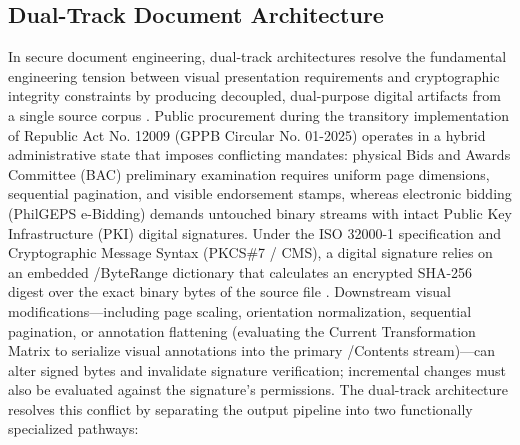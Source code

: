 \subsection{Dual-Track Document Architecture}

In secure document engineering, dual-track architectures resolve the fundamental engineering tension between visual presentation requirements and cryptographic integrity constraints by producing decoupled, dual-purpose digital artifacts from a single source corpus \cite{ref42, ref45}.
Public procurement during the transitory implementation of Republic Act No. 12009 (GPPB Circular No. 01-2025) operates in a hybrid administrative state that imposes conflicting mandates: physical Bids and Awards Committee (BAC) preliminary examination requires uniform page dimensions, sequential pagination, and visible endorsement stamps, whereas electronic bidding (PhilGEPS e-Bidding) demands untouched binary streams with intact Public Key Infrastructure (PKI) digital signatures.
Under the ISO 32000-1 specification and Cryptographic Message Syntax (PKCS\#7 / CMS), a digital signature relies on an embedded /ByteRange dictionary that calculates an encrypted SHA-256 digest over the exact binary bytes of the source file \cite{ref12, ref41}.
Downstream visual modifications---including page scaling, orientation normalization, sequential pagination, or annotation flattening (evaluating the Current Transformation Matrix to serialize visual annotations into the primary /Contents stream)---can alter signed bytes and invalidate signature verification; incremental changes must also be evaluated against the signature's permissions.
The dual-track architecture resolves this conflict by separating the output pipeline into two functionally specialized pathways:

